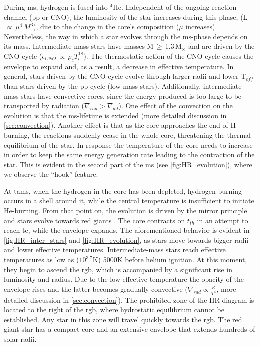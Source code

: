 During \ac{ms}, hydrogen is fused into $^4$He. Independent of the ongoing reaction channel (pp or CNO), the luminosity of the star increases during this phase, (L$\,\propto\,\mu^{4}\,M^3$), due to the change in the core's composition ($\mu$ increases). Nevertheless, the way in which a star evolves through the \ac{ms}-phase depends on its mass. Intermediate-mass stars have masses M\,$\geq$\,1.3\,M$_\odot$ and are driven by the CNO-cycle ($\epsilon_{CNO}\,\propto\,\rho_{c}T^{18}_{c}$). The thermostatic action of the CNO-cycle causes the envelope to expand and, as a result, a decrease in effective temperature. In general, stars driven by the CNO-cycle evolve through larger radii and lower T$_{eff}$ than stars driven by the pp-cycle (low-mass stars). Additionally, intermediate-mass stars have convective cores, since the energy produced is too large to be transported by radiation ($\nabla_{rad} > \nabla_{ad}$). One effect of the convection on the evolution is that the \ac{ms}-lifetime is extended (more detailed discussion in \cref{sec:convection}). Another effect is that as the core approaches the end of H-burning, the reactions suddenly cease in the whole core, threatening the thermal equilibrium of the star. In response the temperature of the core needs to increase in order to keep the same energy generation rate leading to the contraction of the star. This is evident in the second part of the \ac{ms} (see \cref{fig:HR_evolution}), where we observe the ``hook'' feature. 

At \ac{tams}, when the hydrogen in the core has been depleted, hydrogen burning occurs in a shell around it, while the central temperature is insufficient to initiate He-burning. From that point on, the evolution is driven by the mirror principle and stars evolve towards red giants \citep{pols2011stellar}. The core contracts on $t_{th}$ in an attempt to reach \ac{te}, while the envelope expands. The aforementioned behavior is evident in \cref{fig:HR_inter_stars} and \cref{fig:HR_evolution}, as stars move towards bigger radii and lower effective temperatures. Intermediate-mass stars reach effective temperatures as low as ($10^{3.7}$K) 5000K before helium ignition. At this moment, they begin to ascend the \ac{rgb}, which is accompanied by a significant rise in luminosity and radius. Due to the low effective temperature the opacity of the envelope rises and the latter becomes gradually convective ($\nabla_{rad} \propto \frac{\kappa}{T^4}$, more detailed discussion in \cref{sec:convection}). The prohibited zone of the HR-diagram is located to the right of the \ac{rgb}, where hydrostatic equilibrium cannot be established. Any star in this zone will travel quickly towards the \ac{rgb}. The red giant star has a compact core and an extensive envelope that extends hundreds of solar radii. 

